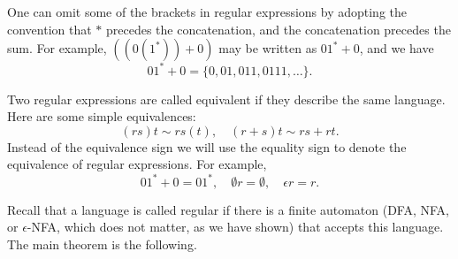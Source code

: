 

One can omit some of the brackets in regular expressions by adopting the convention that $*$ precedes the concatenation, and the concatenation precedes the sum.
For example, $((0(1^*))+0)$ may be written as $01^* + 0$, and we have
\[
01^* + 0 = \{0, 01, 011, 0111, \ldots\}.
\]

Two regular expressions are called equivalent if they describe the same language.
Here are some simple equivalences:
\[
(rs)t \sim rs(t), \quad (r+s)t \sim rs + rt.
\]
Instead of the equivalence sign we will use the equality sign to denote the equivalence of regular expressions.
For example,
\[
01^* + 0 = 01^*, \quad \emptyset r = \emptyset, \quad \epsilon r = r.
\]




Recall that a language is called regular if there is a finite automaton (DFA, NFA, or $\epsilon$-NFA, which does not matter, as we have shown)
that accepts this language.
The main theorem is the following.